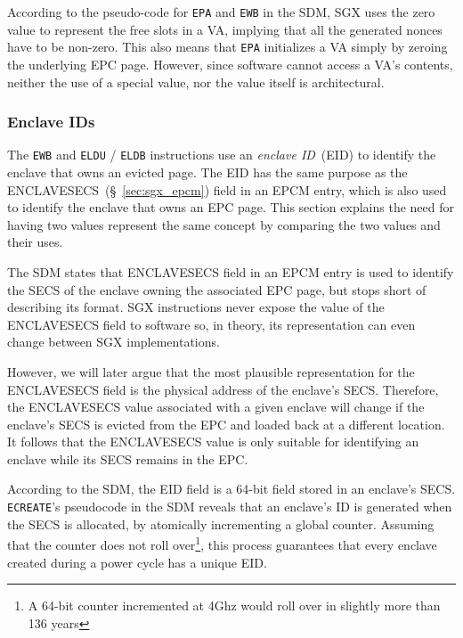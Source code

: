 
According to the pseudo-code for \texttt{EPA} and \texttt{EWB} in the SDM, SGX
uses the zero value to represent the free slots in a VA, implying that all the
generated nonces have to be non-zero. This also means that \texttt{EPA}
initializes a VA simply by zeroing the underlying EPC page. However, since
software cannot access a VA's contents, neither the use of a special value, nor
the value itself is architectural.


\subsubsection{Enclave IDs}
\label{sec:sgx_eid}

The \texttt{EWB} and \texttt{ELDU} / \texttt{ELDB} instructions use an
\textit{enclave ID}~(EID) to identify the enclave that owns an evicted page.
The EID has the same purpose as the ENCLAVESECS~(\S~\ref{sec:sgx_epcm}) field
in an EPCM entry, which is also used to identify the enclave that owns an EPC
page. This section explains the need for having two values represent the same
concept by comparing the two values and their uses.


The SDM states that ENCLAVESECS field in an EPCM entry is used to identify the
SECS of the enclave owning the associated EPC page, but stops short of
describing its format. SGX instructions never expose the value of the
ENCLAVESECS field to software so, in theory, its representation can even change
between SGX implementations.


However, we will later argue that the most plausible representation for the
ENCLAVESECS field is the physical address of the enclave's SECS. Therefore, the
ENCLAVESECS value associated with a given enclave will change if the enclave's
SECS is evicted from the EPC and loaded back at a different location. It
follows that the ENCLAVESECS value is only suitable for identifying an enclave
while its SECS remains in the EPC.


According to the SDM, the EID field is a 64-bit field stored in an enclave's
SECS. \texttt{ECREATE}'s pseudocode in the SDM reveals that an enclave's ID is
generated when the SECS is allocated, by atomically incrementing a global
counter. Assuming that the counter does not roll over\footnote{A 64-bit counter
incremented at 4Ghz would roll over in slightly more than 136 years}, this
process guarantees that every enclave created during a power cycle has a unique
EID.


